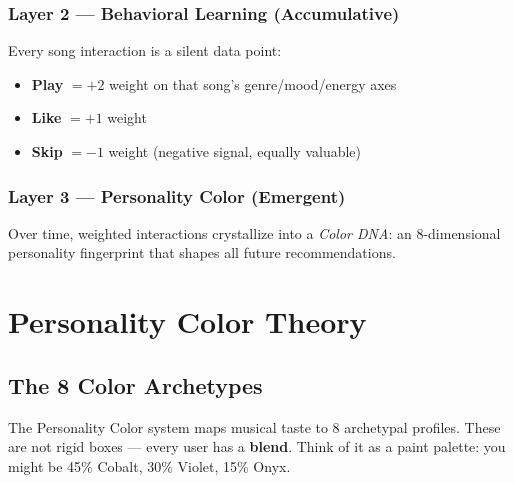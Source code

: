 \documentclass[12pt, a4paper]{report}
\newcommand{\term}[1]{\textit{\color{solarcolor}#1}}
\begin{document}
\subsection{Layer 2 --- Behavioral Learning (Accumulative)}
Every song interaction is a silent data point:
\begin{itemize}[noitemsep]
  \item \textbf{Play} $= +2$ weight on that song's genre/mood/energy axes
  \item \textbf{Like} $= +1$ weight
  \item \textbf{Skip} $= -1$ weight (negative signal, equally valuable)
\end{itemize}

\subsection{Layer 3 --- Personality Color (Emergent)}
Over time, weighted interactions crystallize into a \term{Color DNA}:
an 8-dimensional personality fingerprint that shapes all future recommendations.

\chapter{Personality Color Theory}

\section{The 8 Color Archetypes}

The Personality Color system maps musical taste to 8 archetypal profiles.
These are not rigid boxes --- every user has a \textbf{blend}. Think of it
as a paint palette: you might be 45\% Cobalt, 30\% Violet, 15\% Onyx.
\end{document}
